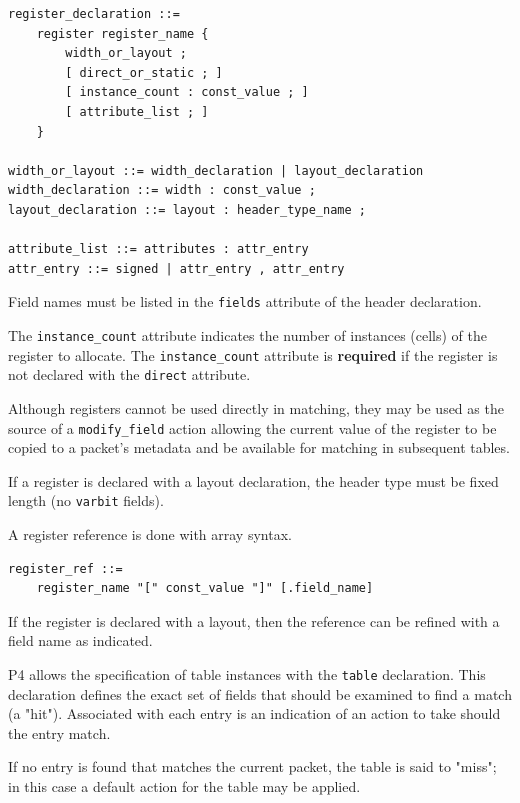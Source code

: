 \documentclass[12pt]{article}
\begin{document}
\begin{lstlisting}[style=BNFstyle]
register_declaration ::= 
    register register_name {
        width_or_layout ;
        [ direct_or_static ; ]
        [ instance_count : const_value ; ]
        [ attribute_list ; ]
    }

width_or_layout ::= width_declaration | layout_declaration
width_declaration ::= width : const_value ;
layout_declaration ::= layout : header_type_name ;

attribute_list ::= attributes : attr_entry
attr_entry ::= signed | attr_entry , attr_entry
\end{lstlisting}

Field names must be listed in the \texttt{fields} attribute of the 
header declaration. 

The \texttt{instance_count} attribute indicates the number of 
instances (cells) of the register to allocate. The 
\texttt{instance_count} attribute is \textbf{required} if the 
register is not declared with the \texttt{direct} attribute.

Although registers cannot be used directly in matching, they may be used as 
the source of a \texttt{modify_field} action allowing the current value 
of the register to be copied to a packet's metadata and be available 
for matching in subsequent tables.

If a register is declared with a layout declaration, the header type must 
be fixed length (no \texttt{varbit} fields).

A register reference is done with array syntax.

\begin{lstlisting}[style=BNFstyle]
register_ref ::=
    register_name "[" const_value "]" [.field_name]
\end{lstlisting}


If the register is declared with a layout, then the reference can be refined 
with a field name as indicated.



P4 allows the specification of table instances with the \texttt{table}
declaration. This declaration defines the exact set of fields that
should be examined to find a match (a "hit").  Associated with each
entry is an indication of an action to take should the entry match.

If no entry is found that matches the current packet, the table is said to 
"miss"; in this case a default action for the table may be applied.
\end{document}
